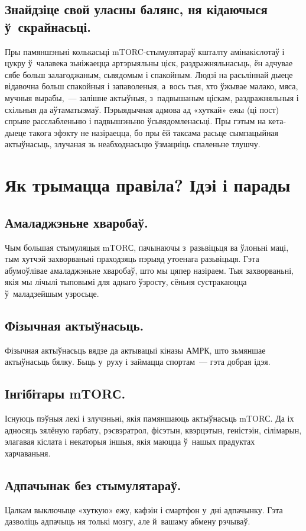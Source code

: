 \subsection{Знайдзіце свой уласны балянс, ня кідаючыся ў~скрайнасьці.}
Пры памяншэньні колькасьці mTORC-стымулятараў кшталту амінакіслотаў і цукру ў~чалавека зьніжаецца артэрыяльны ціск, раздражняльнасьць, ён адчувае сябе больш залагоджаным, сьвядомым і спакойным. Людзі на расьліннай дыеце відавочна больш спакойныя і запаволеныя, а~вось тыя, хто ўжывае малако, мяса, мучныя вырабы,~--- залішне актыўныя, з~падвышаным ціскам, раздражняльныя і схільныя да аўтаматызмаў. Пэрыядычная адмова ад «хуткай» ежы (ці пост) спрыяе расслабленьню і падвышэньню ўсьвядомленасьці. Пры гэтым на кета-дыеце такога эфэкту не назіраецца, бо пры ёй таксама расьце сымпацыйная актыўнасьць, злучаная зь неабходнасьцю ўзмацніць спаленьне тлушчу.

\section{Як трымацца правіла? Ідэі і парады}

\subsection{Амаладжэньне хваробаў.}
Чым большая стымуляцыя mTORС, пачынаючы з~разьвіцьця ва ўлоньні маці, тым хутчэй захворваньні праходзяць пэрыяд утоенага разьвіцьця. Гэта абумоўлівае амаладжэньне хваробаў, што мы цяпер назіраем. Тыя захворваньні, якія мы лічылі тыповымі для аднаго ўзросту, сёньня сустракаюцца ў~маладзейшым узросьце.

\subsection{Фізычная актыўнасьць.}
Фізычная актыўнасьць вядзе да актывацыі кіназы АМРК, што зьмяншае актыўнасьць бялку. Быць у~руху і займацца спортам~--- гэта добрая ідэя.

\subsection{Інгібітары mTORС.}
Існуюць пэўныя лекі і злучэньні, якія памяншаюць актыўнасьць mTORС. Да іх адносяць зялёную гарбату, рэсвэратрол, фісэтын, квэрцэтын, геністэін, сілімарын, элагавая кіслата і некаторыя іншыя, якія маюцца ў~нашых прадуктах харчаваньня.

\subsection{Адпачынак без стымулятараў.}
Цалкам выключыце «хуткую» ежу, кафэін і смартфон у~дні адпачынку. Гэта дазволіць адпачыць ня толькі мозгу, але й~вашаму абмену рэчываў.

